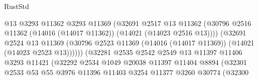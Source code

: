 \begin{lexlean}{RustStd}
\begin{coremodule}
                                          @13
                                          @3293
                                          @11362
                                          @3293
                                          @11369
                                          (@32691
                                            @2517
                                            @13
                                            @11362
                                            (@30796
                                              @2516
                                              @11362
                                              (@14016 (@14017 @11362))
                                              (@14021 (@14023 @2516 @13))))
                                          (@32691
                                            @2524
                                            @13
                                            @11369
                                            (@30796
                                              @2523
                                              @11369
                                              (@14016 (@14017 @11369))
                                              (@14021 (@14023 @2523 @13))))))
                                      (@32281
                                        @2535
                                        @2542
                                        @2549
                                        @13
                                        @11397
                                        @11406
                                        @3293
                                        @11421
                                        (@32292
                                          @2534
                                          @1049
                                          @20038
                                          @11397
                                          @11404
                                          @8894
                                          (@32301
                                            @2533
                                            @53
                                            @55
                                            @3976
                                            @11396
                                            @11403
                                            @3254
                                            @11377
                                            @3260
                                            @30774
                                            (@32300

\end{coremodule}
\end{lexlean}
